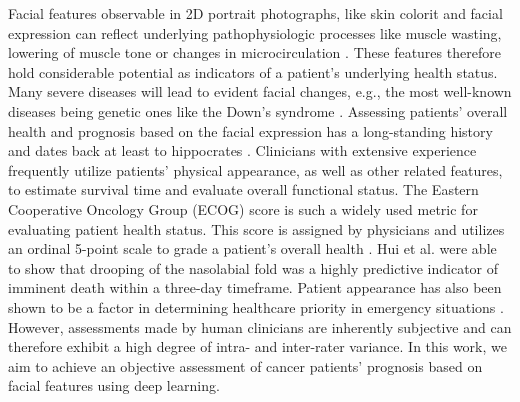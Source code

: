 \documentclass[runningheads]{llncs}
\begin{document}
Facial features observable in 2D portrait photographs, like skin colorit and facial expression can reflect underlying pathophysiologic processes like muscle wasting, lowering of muscle tone or changes in microcirculation \cite{oken1982toxicity}. These features therefore hold considerable potential as indicators of a patient's underlying health status.
Many severe diseases will lead to evident facial changes, e.g., the most well-known diseases being genetic ones like the Down's syndrome \cite{gurovich2019identifying}. 
Assessing patients' overall health and prognosis based on the facial expression has a long-standing history and dates back at least to hippocrates \cite{withington2005hippocratic}.
Clinicians with extensive experience frequently utilize patients' physical appearance, as well as other related features, to estimate survival time and evaluate overall functional status. The Eastern Cooperative Oncology Group (ECOG) score is such a widely used metric for evaluating patient health status. This score is assigned by physicians and utilizes an ordinal 5-point scale to grade a patient's overall health \cite{oken1982toxicity}. 
Hui et al. \cite{hui2015diagnostic} were able to show that drooping of the nasolabial fold  was a highly predictive indicator of imminent death within a three-day timeframe.
Patient appearance has also been shown to be a factor in determining healthcare priority in emergency situations \cite{bagnis2020judging}. However, assessments made by human clinicians are inherently subjective and can therefore exhibit a high degree of intra- and inter-rater variance. In this work, we aim to achieve an objective assessment of cancer patients' prognosis based on facial features using deep learning.
 
\end{document}
